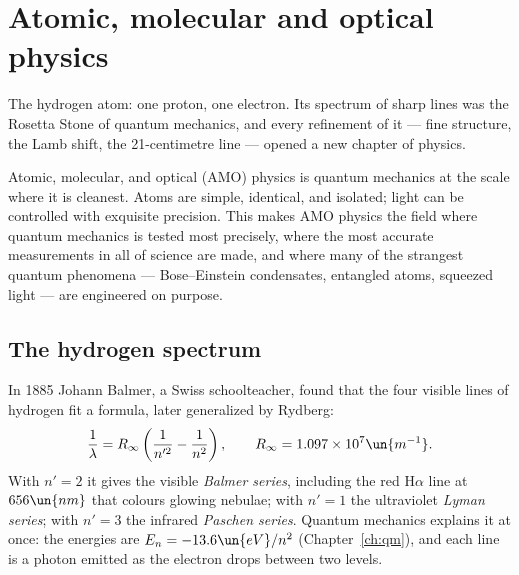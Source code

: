 \chapter{Atomic, molecular and optical physics}
\label{ch:amo}



\begin{prototype}
The hydrogen atom: one proton, one electron. Its spectrum of sharp lines was the Rosetta Stone of quantum mechanics, and every refinement of it --- fine structure, the Lamb shift, the 21-centimetre line --- opened a new chapter of physics.
\end{prototype}

Atomic, molecular, and optical (AMO) physics is quantum mechanics at the scale where it is cleanest. Atoms are simple, identical, and isolated; light can be controlled with exquisite precision. This makes AMO physics the field where quantum mechanics is tested most precisely, where the most accurate measurements in all of science are made, and where many of the strangest quantum phenomena --- Bose--Einstein condensates, entangled atoms, squeezed light --- are engineered on purpose.

\section{The hydrogen spectrum}

In 1885 Johann Balmer, a Swiss schoolteacher, found that the four visible lines of hydrogen fit a formula, later generalized by Rydberg:
\[
  \frac1\lambda = R_\infty\left(\frac{1}{n'^2} - \frac{1}{n^2}\right),\qquad R_\infty = 1.097\times10^{7}\un{m^{-1}}.
\]
With $n' = 2$ it gives the visible \emph{Balmer series}, including the red H$\alpha$ line at $656\un{nm}$ that colours glowing nebulae; with $n'=1$ the ultraviolet \emph{Lyman series}; with $n'=3$ the infrared \emph{Paschen series}. Quantum mechanics explains it at once: the energies are $E_n = -13.6\un{eV}/n^2$ (Chapter~\ref{ch:qm}), and each line is a photon emitted as the electron drops between two levels.


